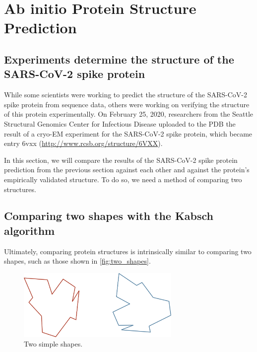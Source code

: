 \FloatBarrier
{}

\section{Ab initio Protein Structure Prediction}
\label{sec:accuracy}
\subsection{Experiments determine the structure of the SARS-CoV-2 spike protein}

While some scientists were working to predict the structure of the SARS-CoV-2 spike protein from sequence data, others were working on verifying the structure of this protein experimentally. On February 25, 2020, researchers from the Seattle Structural Genomics Center for Infectious Disease uploaded to the PDB the result of a cryo-EM experiment for the SARS-CoV-2 spike protein, which became entry 6vxx (\url{http://www.rcsb.org/structure/6VXX}).\\

\begin{note}\end{note}

In this section, we will compare the results of the SARS-CoV-2 spike protein prediction from the previous section against each other and against the protein's empirically validated structure. To do so, we need a method of comparing two structures.

\FloatBarrier
{}
\subsection{Comparing two shapes with the Kabsch algorithm}

Ultimately, comparing protein structures is intrinsically similar to comparing two shapes, such as those shown in \autoref{fig:two_shapes}.\\

\begin{qbox}\end{qbox}

\begin{figure}[h]
	\centering
	\mySfFamily
	\includegraphics[width = 0.7\textwidth]{../images/two_shapes.png}
	\caption{Two simple shapes.}
	\label{fig:two_shapes}
\end{figure}


